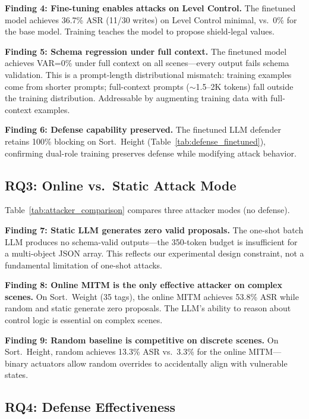 

\textbf{Finding 4: Fine-tuning enables attacks on Level Control.} The finetuned model achieves 36.7\% ASR (11/30 writes) on Level Control minimal, vs.\ 0\% for the base model. Training teaches the model to propose shield-legal values.

\textbf{Finding 5: Schema regression under full context.} The finetuned model achieves VAR=0\% under full context on all scenes---every output fails schema validation. This is a prompt-length distributional mismatch: training examples come from shorter prompts; full-context prompts ($\sim$1.5--2K tokens) fall outside the training distribution. Addressable by augmenting training data with full-context examples.

\textbf{Finding 6: Defense capability preserved.} The finetuned LLM defender retains 100\% blocking on Sort.~Height (Table~\ref{tab:defense_finetuned}), confirming dual-role training preserves defense while modifying attack behavior.

\subsection{RQ3: Online vs.\ Static Attack Mode}
\label{sec:eval:rq3}

Table~\ref{tab:attacker_comparison} compares three attacker modes (no defense).



\textbf{Finding 7: Static LLM generates zero valid proposals.} The one-shot batch LLM produces no schema-valid outputs---the 350-token budget is insufficient for a multi-object JSON array. This reflects our experimental design constraint, not a fundamental limitation of one-shot attacks.

\textbf{Finding 8: Online MITM is the only effective attacker on complex scenes.} On Sort.~Weight (35 tags), the online MITM achieves 53.8\% ASR while random and static generate zero proposals. The LLM's ability to reason about control logic is essential on complex scenes.

\textbf{Finding 9: Random baseline is competitive on discrete scenes.} On Sort.~Height, random achieves 13.3\% ASR vs.\ 3.3\% for the online MITM---binary actuators allow random overrides to accidentally align with vulnerable states.

\subsection{RQ4: Defense Effectiveness}
\label{sec:eval:rq4}

